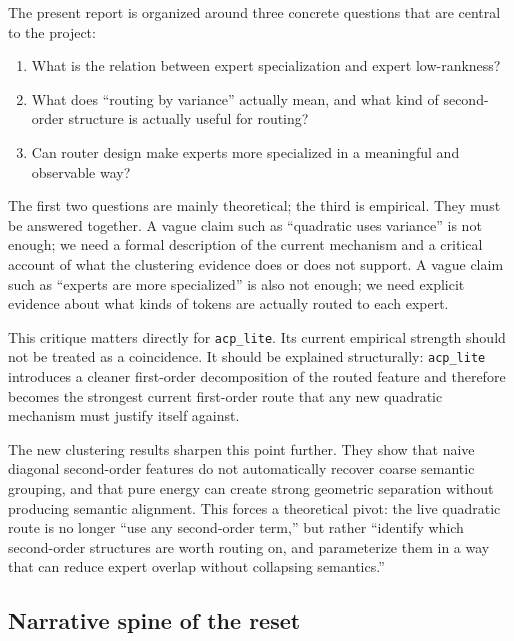 \documentclass[11pt]{article}
\begin{document}
The present report is organized around three concrete questions that are central to the project:
\begin{enumerate}
    \item What is the relation between expert specialization and expert low-rankness?
    \item What does ``routing by variance'' actually mean, and what kind of second-order structure is actually useful for routing?
    \item Can router design make experts more specialized in a meaningful and observable way?
\end{enumerate}

The first two questions are mainly theoretical; the third is empirical. They must be answered together. A vague claim such as ``quadratic uses variance'' is not enough; we need a formal description of the current mechanism and a critical account of what the clustering evidence does or does not support. A vague claim such as ``experts are more specialized'' is also not enough; we need explicit evidence about what kinds of tokens are actually routed to each expert.

This critique matters directly for \texttt{acp\_lite}. Its current empirical strength should not be treated as a coincidence. It should be explained structurally: \texttt{acp\_lite} introduces a cleaner first-order decomposition of the routed feature and therefore becomes the strongest current first-order route that any new quadratic mechanism must justify itself against.

The new clustering results sharpen this point further. They show that naive diagonal second-order features do not automatically recover coarse semantic grouping, and that pure energy can create strong geometric separation without producing semantic alignment. This forces a theoretical pivot: the live quadratic route is no longer ``use any second-order term,'' but rather ``identify which second-order structures are worth routing on, and parameterize them in a way that can reduce expert overlap without collapsing semantics.''

\subsection{Narrative spine of the reset}
\end{document}
